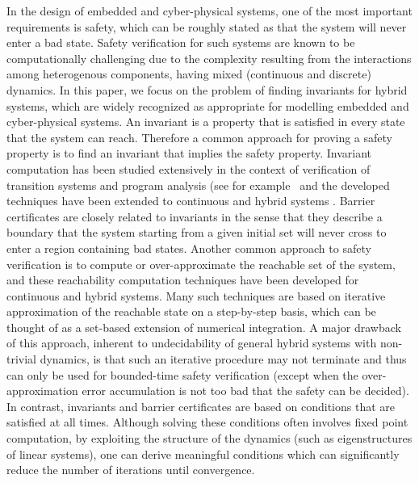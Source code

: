 In the design of embedded and cyber-physical systems, one of the most
important requirements is safety, which can be roughly stated as that
the system will never enter a bad state. Safety verification for such
systems are known to be computationally challenging due to the
complexity resulting from the interactions among heterogenous
components, having mixed (continuous and discrete) dynamics. In this
paper, we focus on the problem of finding invariants for hybrid
systems, which are widely recognized as appropriate for modelling
embedded and cyber-physical systems. An invariant is a property that
is satisfied in every state that the system can reach. Therefore a
common approach for proving a safety property is to find an invariant
that implies the safety property. Invariant computation has been
studied extensively in the context of verification of transition
systems and program analysis (see for
example~\cite{CousotHalbwachs78,DBLP:journals/fmsd/BensalemL99,DBLP:conf/tacas/TiwariRSS01,DBLP:conf/cav/ColonSS03,DBLP:conf/sas/Goubault13}
and the developed techniques have been extended to continuous and
hybrid
systems \cite{DBLP:conf/hybrid/SankaranarayananSM04,%
DBLP:conf/hybrid/Rodriguez-CarbonellT05,DBLP:conf/cdc/SassiGS14,%
HybridFluctuat,DBLP:conf/vmcai/SogokonGJP16,DBLP:conf/aplas/DangG11}. Barrier
certificates \cite{prajna2004safety} are closely related to invariants
in the sense that they describe a boundary that the system starting
from a given initial set will never cross to enter a region containing
bad states. Another common approach to safety verification is to
compute or over-approximate the reachable set of the system, and these
reachability computation techniques have been developed for continuous
and hybrid systems.  Many such techniques are based on iterative
approximation of the reachable state on a step-by-step basis, which
can be thought of as a set-based extension of numerical integration. A
major drawback of this approach, inherent to undecidability of general
hybrid systems with non-trivial dynamics, is that such an iterative
procedure may not terminate and thus can only be used for bounded-time
safety verification (except when the over-approximation error
accumulation is not too bad that the safety can be decided). In
contrast, invariants and barrier certificates are based
on conditions that are satisfied at all times. Although solving these
conditions often involves fixed point computation, by exploiting the
structure of the dynamics (such as eigenstructures of linear systems),
one can derive meaningful conditions which can significantly reduce
the number of iterations until convergence.

